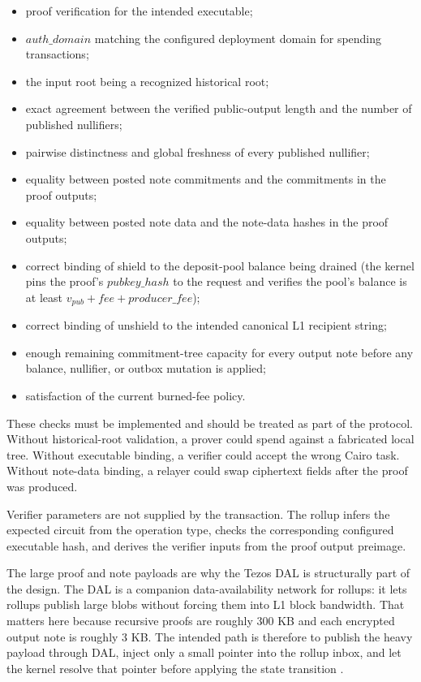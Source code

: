 \documentclass[11pt]{article}
\begin{document}
\begin{itemize}
  \item proof verification for the intended executable;
  \item \(auth\_domain\) matching the configured deployment domain for
        spending transactions;
  \item the input root being a recognized historical root;
  \item exact agreement between the verified public-output length and the
        number of published nullifiers;
  \item pairwise distinctness and global freshness of every published
        nullifier;
  \item equality between posted note commitments and the commitments in the
        proof outputs;
  \item equality between posted note data and the note-data hashes in the
        proof outputs;
  \item correct binding of shield to the deposit-pool balance being drained
        (the kernel pins the proof's \(pubkey\_hash\) to the request and
        verifies the pool's balance is at least
        \(v_{pub} + fee + producer\_fee\));
  \item correct binding of unshield to the intended canonical L1 recipient
        string;
  \item enough remaining commitment-tree capacity for every output note before
        any balance, nullifier, or outbox mutation is applied;
  \item satisfaction of the current burned-fee policy.
\end{itemize}

These checks must be implemented and should be treated as part of the protocol.
Without historical-root validation, a prover could spend against a fabricated local
tree. Without executable binding, a verifier could accept the wrong Cairo task.
Without note-data binding, a relayer could swap ciphertext fields after the
proof was produced.

Verifier parameters are not supplied by the transaction. The rollup infers the
expected circuit from the operation type, checks the corresponding configured
executable hash, and derives the verifier inputs from the proof output
preimage.

The large proof and note payloads are why the Tezos DAL is structurally part of
the design. The DAL is a companion data-availability network for rollups: it
lets rollups publish large blobs without forcing them into L1 block bandwidth.
That matters here because recursive proofs are roughly 300 KB and each encrypted
output note is roughly 3 KB. The intended path is therefore to publish the
heavy payload through DAL, inject only a small pointer into the rollup inbox,
and let the kernel resolve that pointer before applying the state transition
\cite{tezos-smart-rollups,tezos-dal}.
\end{document}
